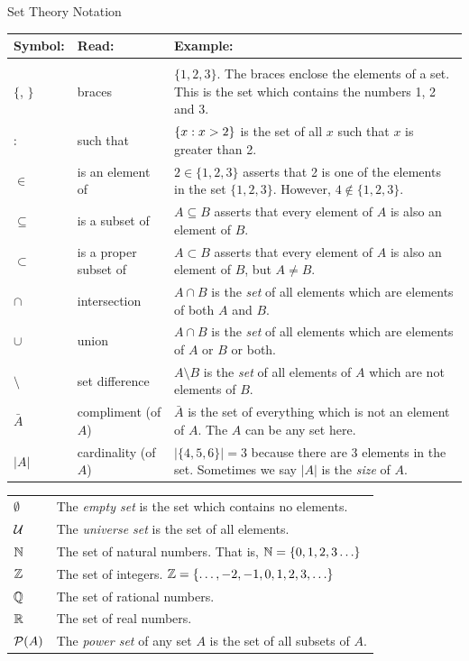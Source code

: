 \documentclass[12pt]{article}
\begin{document}
\newpage
\begin{defbox}{Set Theory Notation}

\noindent  \begin{tabular}{l p{1.5in} p{3.5in}}
    Symbol: & Read: & Example: \\ \hline \\[1ex]
    $\{$, $\}$ & braces & $\{1,2,3\}$.  The braces enclose the elements of a set.  This is the set which contains the numbers 1, 2 and 3.\\[1ex]
    $:$ & such that & $\{x : x > 2\}$ is the set of all $x$ such that $x$ is greater than 2.\\[1ex]
    $\in$ & is an element of & $2 \in \{1,2,3\}$ asserts that 2 is one of the elements in the set $\{1,2,3\}$.  However, $4 \notin\{1,2,3\}$.\\[1ex]
    $\subseteq$ & is a subset of & $A \subseteq B$ asserts that every element of $A$ is also an element of $B$.\\[1ex]
    $\subset$ &is a proper subset of & $A \subset B$ asserts that every element of $A$ is also an element of $B$, but $A \ne B$.\\[1ex]
    $\cap$ & intersection & $A \cap B$ is the {\em set} of all elements which are elements of both $A$ and $B$.\\[1ex]
    $\cup$ & union & $A \cap B$ is the {\em set} of all elements which are elements of $A$ or $B$ or both.\\[1ex]
    $\setminus$ & set difference & $A \setminus B$ is the {\em set} of all elements of $A$ which are not elements of $B$.\\[1ex]
    $\bar A$ & compliment (of $A$) & $\bar A$ is the set of everything which is not an element of $A$.  The $A$ can be any set here.\\[1ex]
    $|A|$ & cardinality (of $A$)& $|\{4,5,6\}| = 3$ because there are 3 elements in the set.  Sometimes we say $|A|$ is the {\em size} of $A$.\\[1ex]
    
  \end{tabular}


\begin{tabular}{l p{5in}}
  $\emptyset$ & The {\em empty set} is the set which contains no elements.\\[1ex]
  $\mathcal U$ & The {\em universe set} is the set of all elements.\\[1ex]
$\mathbb N$ & The set of natural numbers. That is, $\mathbb N = \{0, 1, 2, 3\ldots\}$ \\[1ex]
$\mathbb Z$ & The set of integers.  $\mathbb Z = \{\ldots, -2, -1, 0, 1, 2, 3, \ldots\}$\\[1ex]
$\mathbb Q$ & The set of rational numbers.\\[1ex]
$\mathbb R$ & The set of real numbers.\\[1ex]
$\mathcal P(A)$ & The {\em power set} of any set $A$ is the set of all subsets of $A$.
\end{tabular}


\end{defbox}
\end{document}
